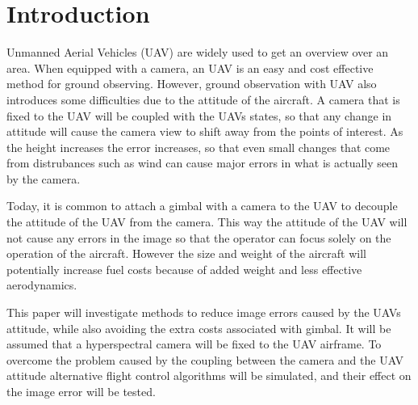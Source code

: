 \section{Introduction}

Unmanned Aerial Vehicles (UAV) are widely used to get an overview over an area. When equipped with a camera, an UAV is an easy and cost effective method for ground observing. However, ground observation with UAV also introduces some difficulties due to the attitude of the aircraft. A camera that is fixed to the UAV will be coupled with the UAVs states, so that any change in attitude will cause the camera view to shift away from the points of interest. As the height increases the error increases, so that even small changes that come from distrubances such as wind can cause major errors in what is actually seen by the camera.

Today, it is common to attach a gimbal with a camera to the UAV to decouple the attitude of the UAV from the camera. This way the attitude of the UAV will not cause any errors in the image so that the operator can focus solely on the operation of the aircraft. However the size and weight of the aircraft will potentially increase fuel costs because of added weight and less effective aerodynamics.

This paper will investigate methods to reduce image errors caused by the UAVs attitude, while also avoiding the extra costs associated with gimbal. It will be assumed that a hyperspectral camera will be fixed to the UAV airframe. To overcome the problem caused by the coupling between the camera and the UAV attitude alternative flight control algorithms will be simulated, and their effect on the image error will be tested.